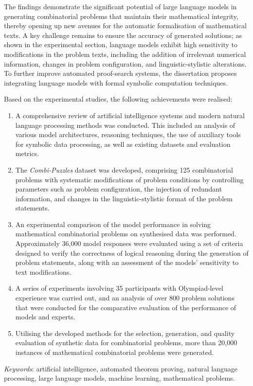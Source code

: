 The findings demonstrate the significant potential of large language models in generating combinatorial problems that maintain their mathematical integrity, thereby opening up new avenues for the automatic formalisation of mathematical texts. A key challenge remains to ensure the accuracy of generated solutions; as shown in the experimental section, language models exhibit high sensitivity to modifications in the problem texts, including the addition of irrelevant numerical information, changes in problem configuration, and linguistic-stylistic alterations. To further improve automated proof-search systems, the dissertation proposes integrating language models with formal symbolic computation techniques.

Based on the experimental studies, the following achievements were realised:
\begin{enumerate}
    \item A comprehensive review of artificial intelligence systems and modern natural language processing methods was conducted. This included an analysis of various model architectures, reasoning techniques, the use of auxiliary tools for symbolic data processing, as well as existing datasets and evaluation metrics.
    \item The \emph{Combi-Puzzles} dataset was developed, comprising 125 combinatorial problems with systematic modifications of problem conditions by controlling parameters such as problem configuration, the injection of redundant information, and changes in the linguistic-stylistic format of the problem statements.
    \item An experimental comparison of the model performance in solving mathematical combinatorial problems on synthesised data was performed. Approximately 36,000 model responses were evaluated using a set of criteria designed to verify the correctness of logical reasoning during the generation of problem statements, along with an assessment of the models' sensitivity to text modifications.
    \item A series of experiments involving 35 participants with Olympiad-level experience was carried out, and an analysis of over 800 problem solutions that were conducted for the comparative evaluation of the performance of models and experts.
    \item Utilising the developed methods for the selection, generation, and quality evaluation of synthetic data for combinatorial problems, more than 20,000 instances of mathematical combinatorial problems were generated.
\end{enumerate}

\emph{Keywords}: artificial intelligence, automated theorem proving, natural language processing, large language models, machine learning, mathematical problems.
